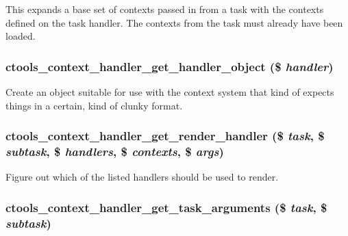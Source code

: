 This expands a base set of contexts passed in from a task with the contexts defined on the task handler. The contexts from the task must already have been loaded. \hypertarget{context-task-handler_8inc_ad6d75da1158b69630c10d3045371accb}{
\subsubsection[{ctools\_\-context\_\-handler\_\-get\_\-handler\_\-object}]{\setlength{\rightskip}{0pt plus 5cm}ctools\_\-context\_\-handler\_\-get\_\-handler\_\-object (\$ {\em handler})}}
\label{context-task-handler_8inc_ad6d75da1158b69630c10d3045371accb}
Create an object suitable for use with the context system that kind of expects things in a certain, kind of clunky format. \hypertarget{context-task-handler_8inc_a681a1468d47bbb2b97137fe724006f30}{
\subsubsection[{ctools\_\-context\_\-handler\_\-get\_\-render\_\-handler}]{\setlength{\rightskip}{0pt plus 5cm}ctools\_\-context\_\-handler\_\-get\_\-render\_\-handler (\$ {\em task}, \/  \$ {\em subtask}, \/  \$ {\em handlers}, \/  \$ {\em contexts}, \/  \$ {\em args})}}
\label{context-task-handler_8inc_a681a1468d47bbb2b97137fe724006f30}
Figure out which of the listed handlers should be used to render. \hypertarget{context-task-handler_8inc_a4179b2d1d2e10e075410d7697605350d}{
\subsubsection[{ctools\_\-context\_\-handler\_\-get\_\-task\_\-arguments}]{\setlength{\rightskip}{0pt plus 5cm}ctools\_\-context\_\-handler\_\-get\_\-task\_\-arguments (\$ {\em task}, \/  \$ {\em subtask})}}
